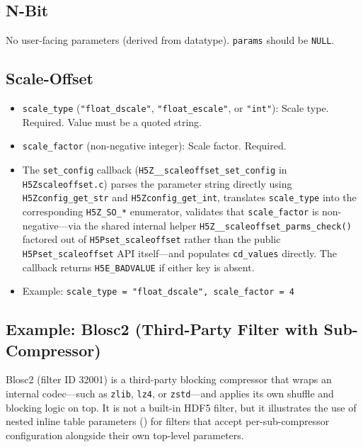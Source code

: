 \documentclass[../RFC-HDFG-2026-001.tex]{subfiles}
\begin{document}
\subsection{N-Bit}

No user-facing parameters (derived from datatype). \texttt{params} should be
\texttt{NULL}.

\subsection{Scale-Offset}

\begin{itemize}
\item \texttt{scale\_type} (\texttt{"float\_dscale"}, \texttt{"float\_escale"}, or
  \texttt{"int"}): Scale type. Required. Value must be a quoted string.
\item \texttt{scale\_factor} (non-negative integer): Scale factor. Required.
\item The \texttt{set\_config} callback (\texttt{H5Z\_\_scaleoffset\_set\_config}
  in \texttt{H5Zscaleoffset.c}) parses the parameter string directly using
  \texttt{H5Zconfig\_get\_str} and \texttt{H5Zconfig\_get\_int}, translates
  \texttt{scale\_type} into the corresponding \texttt{H5Z\_SO\_*} enumerator,
  validates that \texttt{scale\_factor} is non-negative---via the shared internal
  helper \texttt{H5Z\_\_scaleoffset\_parms\_check()} factored out of
  \texttt{H5Pset\_scaleoffset} rather than the public
  \texttt{H5Pset\_scaleoffset} API itself---and populates \texttt{cd\_values}
  directly.  The callback returns \texttt{H5E\_BADVALUE} if either key is
  absent.
\item Example: \texttt{scale\_type = "float\_dscale", scale\_factor = 4}
\end{itemize}

\subsection{Example: Blosc2 (Third-Party Filter with Sub-Compressor)}
\label{sec:blosc-example}

Blosc2 (filter ID 32001) is a third-party blocking compressor that wraps an
internal codec---such as \texttt{zlib}, \texttt{lz4}, or \texttt{zstd}---and
applies its own shuffle and blocking logic on top.  It is not a built-in HDF5
filter, but it illustrates the use of nested inline table parameters
() for filters that accept per-sub-compressor
configuration alongside their own top-level parameters.
\end{document}
